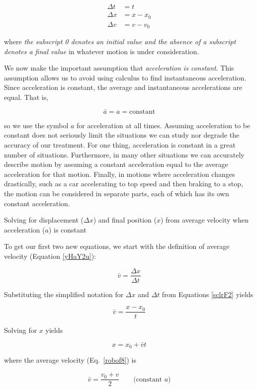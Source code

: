 \documentclass[../../main-ap-physics.tex]{subfiles}
\begin{document}
\begin{align} \label{sclrF2}
    \Delta t &= t\\[0.5ex]
    \Delta x &= x - x_0\\[0.5ex]
    \Delta v &= v - v_0
\end{align}

where \textit{the subscript 0 denotes an initial value and the absence of a subscript denotes a final value} in whatever motion is under consideration.

\vspace{1em}

We now make the important assumption that \textit{acceleration is constant}. This assumption allows us to avoid using calculus to find instantaneous acceleration. Since acceleration is constant, the average and instantaneous accelerations are equal. That is,

\begin{equation}
    \bar{a} = a = \text{constant}
\end{equation}

so we use the symbol $a$ for acceleration at all times. Assuming acceleration to be constant does not seriously limit the situations we can study nor degrade the accuracy of our treatment. For one thing, acceleration is constant in a great number of situations. Furthermore, in many other situations we can accurately describe motion by assuming a constant acceleration equal to the average acceleration for that motion. Finally, in motions where acceleration changes drastically, such as a car accelerating to top speed and then braking to a stop, the motion can be considered in separate parts, each of which has its own constant acceleration.

\begin{gradient}{Solving for displacement ($\Delta x$) and final position ($x$) from average velocity when acceleration ($a$) is constant}


To get our first two new equations, we start with the definition of average velocity (Equation \ref{yHaY2u}): 

\begin{equation*}
    \bar{v} = \frac{\Delta x}{\Delta t}
\end{equation*}

Substituting the simplified notation for $\Delta{x}$ and $\Delta{t}$ from Equations \eqref{sclrF2} yields 

\begin{equation*}
    \bar{v} = \frac{x - x_0}{t}
\end{equation*}

Solving for $x$ yields 

\begin{equation} \label{FokTWv}
    x = x_0 + \bar{v}t
\end{equation}

where the average velocity (Eq.~\ref{robof8}) is

\begin{equation}
    \bar{v} = \frac{v_0 + v}{2} \qquad \text{(constant $a$)}
\end{equation}
\end{gradient}
\end{document}
